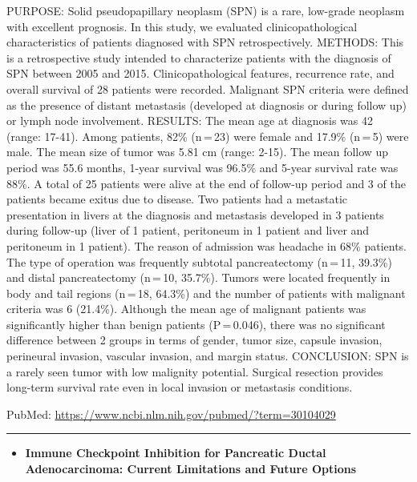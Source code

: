 \documentclass[]{article}
\providecommand{\tightlist}{%
  \setlength{\itemsep}{0pt}\setlength{\parskip}{0pt}}
\begin{document}
PURPOSE: Solid pseudopapillary neoplasm (SPN) is a rare, low-grade
neoplasm with excellent prognosis. In this study, we evaluated
clinicopathological characteristics of patients diagnosed with SPN
retrospectively. METHODS: This is a retrospective study intended to
characterize patients with the diagnosis of SPN between 2005 and 2015.
Clinicopathological features, recurrence rate, and overall survival of
28 patients were recorded. Malignant SPN criteria were defined as the
presence of distant metastasis (developed at diagnosis or during follow
up) or lymph node involvement. RESULTS: The mean age at diagnosis was 42
(range: 17-41). Among patients, 82\% (n\,=\,23) were female and 17.9\%
(n\,=\,5) were male. The mean size of tumor was 5.81 cm (range: 2-15).
The mean follow up period was 55.6 months, 1-year survival was 96.5\%
and 5-year survival rate was 88\%. A total of 25 patients were alive at
the end of follow-up period and 3 of the patients became exitus due to
disease. Two patients had a metastatic presentation in livers at the
diagnosis and metastasis developed in 3 patients during follow-up (liver
of 1 patient, peritoneum in 1 patient and liver and peritoneum in 1
patient). The reason of admission was headache in 68\% patients. The
type of operation was frequently subtotal pancreatectomy (n\,=\,11,
39.3\%) and distal pancreatectomy (n\,=\,10, 35.7\%). Tumors were
located frequently in body and tail regions (n\,=\,18, 64.3\%) and the
number of patients with malignant criteria was 6 (21.4\%). Although the
mean age of malignant patients was significantly higher than benign
patients (P\,=\,0.046), there was no significant difference between 2
groups in terms of gender, tumor size, capsule invasion, perineural
invasion, vascular invasion, and margin status. CONCLUSION: SPN is a
rarely seen tumor with low malignity potential. Surgical resection
provides long-term survival rate even in local invasion or metastasis
conditions.

PubMed: \url{https://www.ncbi.nlm.nih.gov/pubmed/?term=30104029}

{}

{}

\begin{center}\rule{0.5\linewidth}{\linethickness}\end{center}

\begin{itemize}
\tightlist
\item
  \textbf{Immune Checkpoint Inhibition for Pancreatic Ductal
  Adenocarcinoma: Current Limitations and Future Options}
\end{itemize}
\end{document}
